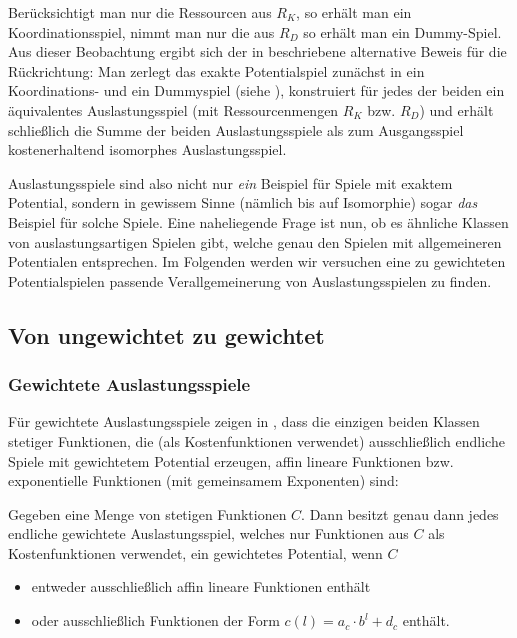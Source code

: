 \begin{bem}
	Berücksichtigt man nur die Ressourcen aus $R_K$, so erhält man ein Koordinationsspiel, nimmt man nur die aus $R_D$ so erhält man ein Dummy-Spiel. Aus dieser Beobachtung ergibt sich der in \cite{KoordDummy} beschriebene alternative Beweis für die Rückrichtung: Man zerlegt das exakte Potentialspiel zunächst in ein Koordinations- und ein Dummyspiel (siehe ), konstruiert für jedes der beiden ein äquivalentes Auslastungsspiel (mit Ressourcenmengen $R_K$ bzw. $R_D$) und erhält schließlich die Summe der beiden Auslastungsspiele als zum Ausgangsspiel kostenerhaltend isomorphes Auslastungsspiel.
\end{bem}

Auslastungsspiele sind also nicht nur \emph{ein} Beispiel für Spiele mit exaktem Potential, sondern in gewissem Sinne (nämlich bis auf Isomorphie) sogar \emph{das} Beispiel für solche Spiele. Eine naheliegende Frage ist nun, ob es ähnliche Klassen von \glqq auslastungsartigen\grqq{} Spielen gibt, welche genau den Spielen mit allgemeineren Potentialen entsprechen. Im Folgenden werden wir versuchen eine zu gewichteten Potentialspielen passende Verallgemeinerung von Auslastungsspielen zu finden.

\subsection{Von ungewichtet zu gewichtet}

\subsubsection{Gewichtete Auslastungsspiele}

Für gewichtete Auslastungsspiele zeigen \citeauthor{CharExGewPotinWCG} in \cite[Theorem 3.9]{CharExGewPotinWCG}, dass die einzigen beiden Klassen stetiger Funktionen, die (als Kostenfunktionen verwendet) ausschließlich endliche Spiele mit gewichtetem Potential erzeugen, affin lineare Funktionen bzw. exponentielle Funktionen (mit gemeinsamem Exponenten) sind:

\begin{satz}\label{satz:CharExGewPotinWCG}
	Gegeben eine Menge von stetigen Funktionen $C$. Dann besitzt genau dann jedes endliche gewichtete Auslastungsspiel, welches nur Funktionen aus $C$ als Kostenfunktionen verwendet, ein gewichtetes Potential, wenn $C$
	\begin{itemize}
		\item entweder ausschließlich affin lineare Funktionen enthält
		\item oder ausschließlich Funktionen der Form $c(l) = a_c\cdot b^l + d_c$ enthält.
	\end{itemize}
\end{satz}

